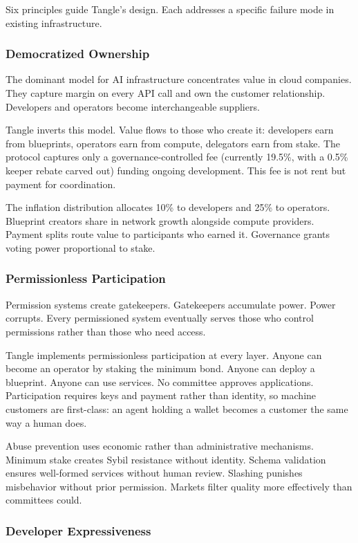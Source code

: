 \documentclass[11pt,a4paper]{article}
\begin{document}
Six principles guide Tangle's design. Each addresses a specific failure mode in existing infrastructure.

\subsubsection{Democratized Ownership}

The dominant model for AI infrastructure concentrates value in cloud companies. They capture margin on every API call and own the customer relationship. Developers and operators become interchangeable suppliers.

Tangle inverts this model. Value flows to those who create it: developers earn from blueprints, operators earn from compute, delegators earn from stake. The protocol captures only a governance-controlled fee (currently 19.5\%, with a 0.5\% keeper rebate carved out) funding ongoing development. This fee is not rent but payment for coordination.

The inflation distribution allocates 10\% to developers and 25\% to operators. Blueprint creators share in network growth alongside compute providers. Payment splits route value to participants who earned it. Governance grants voting power proportional to stake.

\subsubsection{Permissionless Participation}

Permission systems create gatekeepers. Gatekeepers accumulate power. Power corrupts. Every permissioned system eventually serves those who control permissions rather than those who need access.

Tangle implements permissionless participation at every layer. Anyone can become an operator by staking the minimum bond. Anyone can deploy a blueprint. Anyone can use services. No committee approves applications. Participation requires keys and payment rather than identity, so machine customers are first-class: an agent holding a wallet becomes a customer the same way a human does.

Abuse prevention uses economic rather than administrative mechanisms. Minimum stake creates Sybil resistance without identity. Schema validation ensures well-formed services without human review. Slashing punishes misbehavior without prior permission. Markets filter quality more effectively than committees could.

\subsubsection{Developer Expressiveness}
\end{document}
